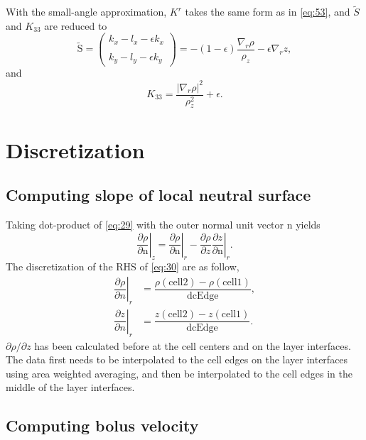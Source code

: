 \documentclass[12pt]{report}
\def\p{\partial}
\def\tilde{\widetilde}
\def\bs{\boldsymbol}
\def\nb{\bs{\mathrm{n}}}
\def\Sb{\bs{\mathrm{S}}}
\begin{document}
With the small-angle  approximation, $K^r$ takes the same form as in
\eqref{eq:53}, and $\tilde{S}$ and $K_{33}$ are reduced to 
\begin{equation}
\label{eq:56}
 \tilde{\Sb} = \left(\begin{matrix}k_x- l_x - \epsilon k_x \\
 \\ 
  k_y-l_y - \epsilon k_y
  \end{matrix}\right) =  -(1-\epsilon)\dfrac{\nabla_r\rho}{\rho_z} - 
  \epsilon\nabla_r z,
\end{equation}
and 
\begin{equation}
\label{eq:57}
K_{33} = \dfrac{|\nabla_r\rho|^2}{\rho_z^2}+\epsilon.
\end{equation}


\section{Discretization}

\subsection{Computing slope of local neutral surface}

Taking dot-product of \eqref{eq:29} with the outer normal unit vector
$\nb$ yields
\begin{equation}
\left.\dfrac{\p\rho}{\p \mathrm{n}}\right|_z = 
\left.\dfrac{\p\rho}{\p\mathrm{n}}\right|_r - \left.\dfrac{\p\rho}{\p z}
\dfrac{\p z}{\p\mathrm{n}}\right|_r.
\label{eq:30}
\end{equation}
The discretization of the RHS of \eqref{eq:30} are as follow,
\begin{align*}
\left.\dfrac{\p\rho}{\p n}\right|_r &= 
\dfrac{\rho(\textrm{cell2}) - \rho(\textrm{cell1})}{\textrm{dcEdge}},\\
\left.\dfrac{\p z}{\p n}\right|_r &= 
\dfrac{z(\textrm{cell2}) - z(\textrm{cell1})}{\textrm{dcEdge}}.
\end{align*}
$\p\rho/\p z$ has been calculated before at the cell centers and on 
the layer interfaces. The data first needs to be interpolated to the cell 
edges on the layer interfaces using area weighted averaging, and then
be interpolated to the cell edges in the middle of the layer 
interfaces.

\subsection{Computing bolus velocity}
\end{document}
